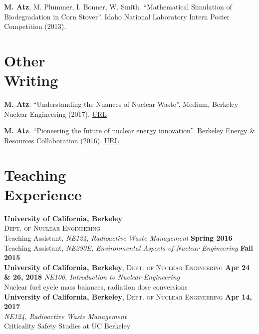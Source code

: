 \documentclass[margin,line]{resume}
\begin{document}
\begin{resume}
\begin{bibenum}
    \item \textbf{M. Atz}, M. Plummer, I. Bonner, W. Smith. ``Mathematical Simulation of Biodegradation in Corn Stover''. Idaho National Laboratory Intern Poster Competition (2013).

\end{bibenum}
\vspace{0mm}


\section{\mysidestyle Other\\Writing}
\begin{bibenum}

    \item \textbf{M. Atz}. ``Understanding the Nuances of Nuclear Waste''. Medium, Berkeley Nuclear Engineering (2017). \href{https://medium.com/berkeley-nuclear-engineering/understanding-the-nuances-of-nuclear-waste-5c123ba4211f}{URL}
    
    \item \textbf{M. Atz}. ``Pioneering the future of nuclear energy innovation''. Berkeley Energy & Resources Collaboration (2016). \href{http://berc.berkeley.edu/pioneering-future-nuclear-energy-innovation/}{URL}

\end{bibenum}


\section{\mysidestyle Teaching\\Experience}
    
\textbf{University of California, Berkeley} \\
\textsc{Dept. of Nuclear Engineering} \\ 
Teaching Assistant, \textsl{NE124, Radioactive Waste Management} 
    \hfill \textbf{Spring 2016} \\
Teaching Assistant, \textsl{NE290E, Environmental Aspects of Nuclear Engineering} \hfill \textbf{Fall 2015} \vspace{6mm}\\
\textbf{University of California, Berkeley}, \textsc{Dept. of Nuclear Engineering} 
    \hfill \textbf{Apr 24 \& 26, 2018}
    \textsl{NE100, Introduction to Nuclear Engineering} \\
    Nuclear fuel cycle mass balances, radiation dose conversions
    \vspace{2mm} \\ 
\textbf{University of California, Berkeley}, \textsc{Dept. of Nuclear Engineering} \hfill \textbf{Apr 14, 2017} \\
    \textsl{NE124, Radioactive Waste Management} \\
    Criticality Safety Studies at UC Berkeley \\
    

\end{resume}
\end{document}

